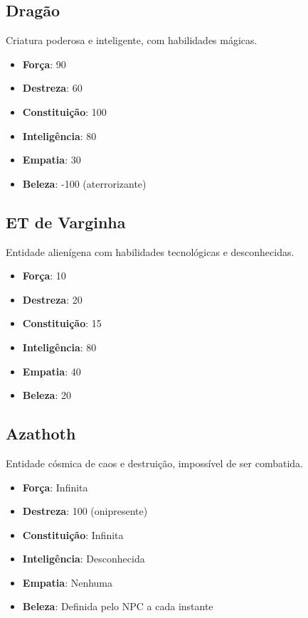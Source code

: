 \documentclass[a4paper,12pt]{book}
\begin{document}
\subsection{Dragão}

Criatura poderosa e inteligente, com habilidades mágicas.

\begin{itemize}
    \item \textbf{Força}: 90
    \item \textbf{Destreza}: 60
    \item \textbf{Constituição}: 100
    \item \textbf{Inteligência}: 80
    \item \textbf{Empatia}: 30
    \item \textbf{Beleza}: -100 (aterrorizante)
\end{itemize}

\subsection{ET de Varginha}

Entidade alienígena com habilidades tecnológicas e desconhecidas.

\begin{itemize}
    \item \textbf{Força}: 10
    \item \textbf{Destreza}: 20
    \item \textbf{Constituição}: 15
    \item \textbf{Inteligência}: 80
    \item \textbf{Empatia}: 40
    \item \textbf{Beleza}: 20
\end{itemize}

\subsection{Azathoth}

Entidade cósmica de caos e destruição, impossível de ser combatida.

\begin{itemize}
    \item \textbf{Força}: Infinita
    \item \textbf{Destreza}: 100 (onipresente)
    \item \textbf{Constituição}: Infinita
    \item \textbf{Inteligência}: Desconhecida
    \item \textbf{Empatia}: Nenhuma
    \item \textbf{Beleza}: Definida pelo NPC a cada instante
\end{itemize}
\end{document}
